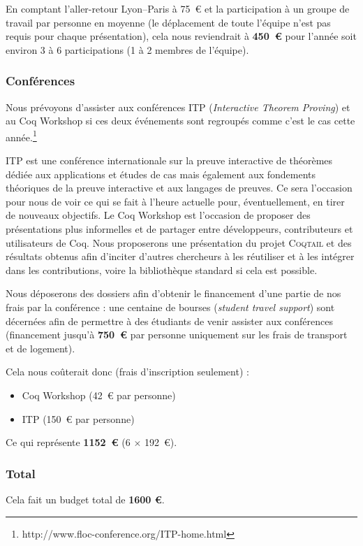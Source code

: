 \documentclass[11pt]{article}
\newcommand{\coqtail}{\textsc{Coqtail}}
\begin{document}
En comptant l'aller-retour Lyon--Paris à 75~€ et la participation à un groupe de travail par personne en moyenne (le déplacement de toute l'équipe n'est pas requis pour chaque présentation), cela nous reviendrait à \textbf{450~€} pour l'année soit environ 3 à 6 participations (1 à 2 membres de l'équipe).

\subsubsection{Conférences}
Nous prévoyons d'assister aux conférences ITP (\textit{Interactive Theorem Proving}) et au Coq Workshop si ces deux événements sont regroupés comme c'est le cas cette année.\footnote{http://www.floc-conference.org/ITP-home.html}

ITP est une conférence internationale sur la preuve interactive de théorèmes dédiée aux applications et études de cas mais également aux fondements théoriques de la preuve interactive et aux langages de preuves. Ce sera l'occasion pour nous de voir ce qui se fait à l'heure actuelle pour, éventuellement, en tirer de nouveaux objectifs. Le Coq Workshop est l'occasion de proposer des présentations plus informelles et de partager entre développeurs, contributeurs et utilisateurs de Coq. Nous proposerons une présentation du projet \coqtail{} et des résultats obtenus afin d'inciter d'autres chercheurs à les réutiliser et à les intégrer dans les contributions, voire la bibliothèque standard si cela est possible.

Nous déposerons des dossiers afin d'obtenir le financement d'une partie de nos frais par la conférence : une centaine de bourses (\emph{student travel support}) sont décernées afin de permettre à des étudiants de venir assister aux conférences (financement jusqu'à \textbf{750~€} par personne uniquement sur les frais de transport et de logement).

Cela nous coûterait donc (frais d'inscription seulement) :
\begin{itemize}
	\item Coq Workshop (42~€ par personne)
	\item ITP (150~€ par personne)
\end{itemize}

Ce qui représente \textbf{1152~€} (6 $\times$ 192~€).

\subsubsection{Total}

Cela fait un budget total de \textbf{1600 €}.

\printbibliography
\end{document}
